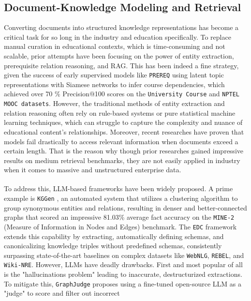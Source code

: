 \subsection{Document-Knowledge Modeling and Retrieval}
    Converting documents into structured knowledge representations has become a critical task for so long in the industry and education specifically. To replace manual 
curation in educational contexts, which is time-consuming and not scalable, prior attempts have been focusing on the power of entity extraction, prerequisite relation 
reasoning, and RAG. This has been indeed a fine strategy, given the success of early supervised models like \texttt{PREREQ} \cite{PREREQ} using latent topic 
representations with Siamese networks to infer course dependencies, which achieved over 70 \% Precision@100 scores on the \texttt{University Course} 
and \texttt{NPTEL MOOC datasets}. However, the traditional methods of entity extraction and relation reasoning often rely on rule-based systems or pure statistical machine learning techniques, 
which can struggle to capture the complexity and nuance of educational content's relationships. Moreover, recent researches \cite{weller2025theoretical,LostInTheMiddle} have proven that models 
fail drastically to access relevant information when documents exceed a certain length. That is the reason why though prior researches gained impressive results on medium retrieval benchmarks, 
they are not easily applied in industry when it comes to massive and unstructured enterprise data.
\\\\
    To address this, LLM-based frameworks have been widely proposed. A prime example is \texttt{KGGen} \cite{KGGen}, an automated system that utilizes a 
clustering algorithm to group synonymous entities and relations, resulting in denser and better-connected graphs that scored an impressive 81.03\% average 
fact accuracy on the \texttt{MINE-2} (Measure of Information in Nodes and Edges) benchmark. The \texttt{EDC} \cite{EDC} framework extends this capability by 
extracting, automatically defining schemas, and canonicalizing knowledge triples without predefined schemas, consistently surpassing state-of-the-art baselines on 
complex datasets like \texttt{WebNLG}, \texttt{REBEL}, and \texttt{Wiki-NRE}. 
    However, LLMs have deadly drawbacks. First and most popular of all is the "hallucinations problem" leading to inaccurate, destructurized extractions. To mitigate this, \texttt{GraphJudge} \cite{GraphJudge} proposes using a fine-tuned open-source LLM as a "judge" to score and filter out incorrect 

